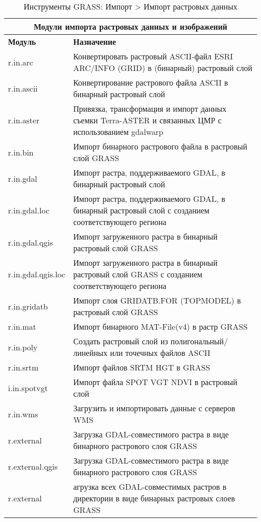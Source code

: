 {\renewcommand{\arraystretch}{0.7}
\begin{table}[H]
\centering
 \begin{tabular}{|p{2.5cm}|p{11.5cm}|}
  \hline \multicolumn{2}{|c|}{\textbf{Модули импорта растровых данных и изображений}} \\
  \hline \textbf{Модуль} & \textbf{Назначение} \\
  \hline r.in.arc & Конвертировать растровый ASCII-файл ESRI ARC/INFO (GRID)
  в (бинарный) растровый слой \\
  \hline r.in.ascii & Конвертирование растрового файла ASCII в бинарный
  растровый слой \\
  \hline r.in.aster & Привязка, трансформация и импорт данных съемки
  Terra-ASTER и связанных ЦМР с использованием gdalwarp \\
  \hline r.in.bin & Импорт бинарного растрового файла в растровый слой
  GRASS \\
  \hline r.in.gdal & Импорт растра, поддерживаемого GDAL, в бинарный
  растровый слой \\
  \hline r.in.gdal.loc & Импорт растра, поддерживаемого GDAL, в бинарный
  растровый слой с созданием соответствующего региона \\
  \hline r.in.gdal.qgis & Импорт загруженного растра в бинарный
  растровый слой GRASS \\
  \hline r.in.gdal.qgis.loc & Импорт загруженного растра в бинарный
  растровый слой GRASS с созданием соответствующего региона \\
  \hline r.in.gridatb & Импорт слоя GRIDATB.FOR (TOPMODEL) в растровый
  слой GRASS \\
  \hline r.in.mat & Импорт бинарного MAT-File(v4) в растр GRASS \\
  \hline r.in.poly & Создать растровый слой из полигональный/линейных
  или точечных файлов ASCII \\
  \hline r.in.srtm & Импорт файлов SRTM HGT в GRASS \\
  \hline i.in.spotvgt & Импорт файла SPOT VGT NDVI в растровый слой \\
  \hline r.in.wms & Загрузить и импортировать данные с серверов WMS \\
  \hline r.external & Загрузка GDAL-совместимого растра в виде бинарного
  растрового слоя GRASS \\
  \hline r.external.qgis & Загрузка GDAL-совместимого растра в виде бинарного
  растрового слоя GRASS \\
  \hline r.external & агрузка всех GDAL-совместимых растров в директории
  в виде бинарных растровых слоев GRASS \\
  \hline
\end{tabular}
\caption{Инструменты GRASS: Импорт > Импорт растровых данных}
\end{table}}

